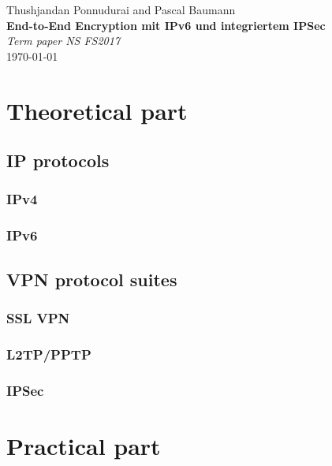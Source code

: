 \documentclass[a4paper]{report}
\newcommand*{\titleAP}{\begingroup %
	\centering
	\vspace*{\baselineskip} %
	
	{\Large Thushjandan Ponnudurai} and {\Large Pascal Baumann}\\[0.167\textheight] %
	
	{\Huge\bfseries End-to-End Encryption mit IPv6 und integriertem IPSec}\\[\baselineskip]
	
	{\Large \textit{Term paper NS FS2017}}\\
	\today
	
	\vspace*{3\baselineskip} %
	\endgroup}
\begin{document}
\titleAP

\newpage

\begin{abstract}
	\blindtext
\end{abstract}

\tableofcontents

\newpage

\chapter{Theoretical part}
\label{ch:Theory}

\section{IP protocols}
\label{sec:IPprot}

\subsection{IPv4}
\label{ssec:IPv4}

\subsection{IPv6}
\label{ssec:IPv6}

\section{VPN protocol suites}
\label{sec:VPNs}

\subsection{SSL VPN}
\label{ssec:sslvpn}

\subsection{L2TP/PPTP}
\label{ssec:l2tppptp}

\subsection{IPSec}
\label{ssec:IPSec}


\chapter{Practical part}
\label{ch:Practical}

\newpage

\printbibliography
\end{document}
